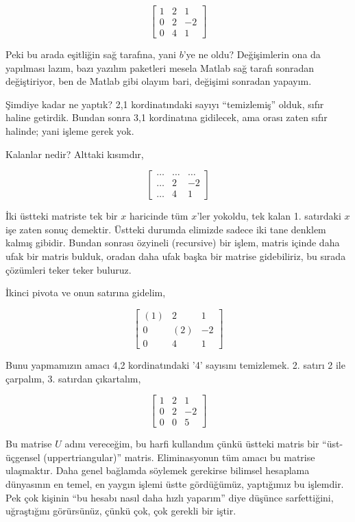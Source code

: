 \documentclass[12pt,fleqn]{article}\usepackage{../../common}
\begin{document}
$$ 
\left[\begin{array}{rrr}
    1 & 2 & 1 \\
    0 & 2 & -2 \\
    0 & 4 & 1
  \end{array}\right]
$$

Peki bu arada eşitliğin sağ tarafına, yani $b$'ye ne oldu? Değişimlerin ona
da yapılması lazım, bazı yazılım paketleri mesela Matlab sağ tarafı
sonradan değiştiriyor, ben de Matlab gibi olayım bari, değişimi sonradan
yapayım. 

Şimdiye kadar ne yaptık? 2,1 kordinatındaki sayıyı ``temizlemiş'' olduk,
sıfır haline getirdik. Bundan sonra 3,1 kordinatına gidilecek, ama orası
zaten sıfır halinde; yani işleme gerek yok. 

Kalanlar nedir? Alttaki kısımdır,

$$ 
\left[\begin{array}{rrr}
    \dots & \dots & \dots \\
    \dots &  2 & -2 \\
    \dots & 4 &  1
  \end{array}\right]
$$

İki üstteki matriste tek bir $x$ haricinde tüm $x$'ler yokoldu, tek kalan
1. satırdaki $x$ işe zaten sonuç demektir. Üstteki durumda elimizde sadece
iki tane denklem kalmış gibidir. Bundan sonrası özyineli (recursive) bir
işlem, matris içinde daha ufak bir matris bulduk, oradan daha ufak başka
bir matrise gidebiliriz, bu sırada çözümleri teker teker buluruz.

İkinci pivota ve onun satırına gidelim,

$$ 
\left[\begin{array}{rrr}
    (1) & 2 & 1 \\
    0 & (2) & -2 \\
    0 & 4 &  1
  \end{array}\right]
$$


Bunu yapmamızın amacı 4,2 kordinatındaki '4' sayısını temizlemek. 2. satırı
2 ile çarpalım, 3. satırdan çıkartalım,

$$ 
\left[\begin{array}{rrr}
1 & 2 & 1 \\
0 & 2 & -2 \\
0 & 0 & 5
\end{array}\right]
 $$

Bu matrise $U$ adını vereceğim, bu harfi kullandım çünkü üstteki matris bir
``üst-üçgensel (uppertriangular)'' matris. Eliminasyonun tüm amacı bu
matrise ulaşmaktır. Daha genel bağlamda söylemek gerekirse bilimsel
hesaplama dünyasının en temel, en yaygın işlemi üstte gördüğümüz,
yaptığımız bu işlemdir. Pek çok kişinin ``bu hesabı nasıl daha hızlı
yaparım'' diye düşünce sarfettiğini, uğraştığını görürsünüz, çünkü çok, çok
gerekli bir iştir. 
\end{document}

